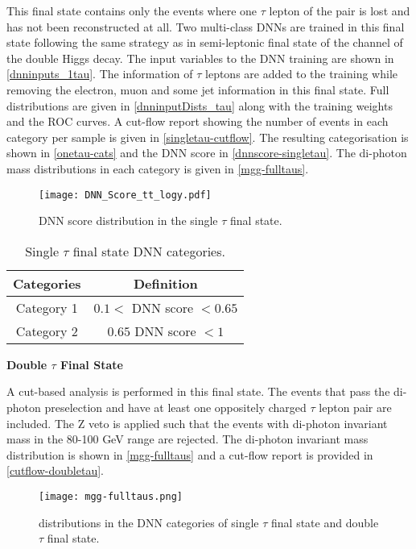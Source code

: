 {This final state contains only the events where one $\tau$ lepton of the pair is lost and has not been reconstructed at all. Two multi-class DNNs are trained in this final state following the same strategy as in semi-leptonic final state of the \wwgg channel of the double Higgs decay. The input variables to the DNN training are shown in \autoref{dnninputs_1tau}. The information of $\tau$ leptons are added to the training while removing the electron, muon and some jet information in this final state. Full distributions are given in \autoref{dnninputDists_tau} along with the training weights and the ROC curves. A cut-flow report showing the number of events in each category per sample is given in \autoref{singletau-cutflow}. The resulting categorisation is shown in \autoref{onetau-cats} and the DNN score in \autoref{dnnscore-singletau}. The di-photon mass distributions in each category is given in \autoref{mgg-fulltaus}.

\begin{figure}[h!]
    \centering
	\texttt{[image: DNN\_Score\_tt\_logy.pdf]}
	\vspace{2mm}
	\caption{DNN score distribution in the single $\tau$ final state.}
	\label{dnnscore-singletau}
\end{figure}

\begin{table}[h!]
    \centering
    \begin{tabular}{cc}
    \hline
    \hline
        Categories  &   Definition \\
        \hline
        Category 1 & $ 0.1< $ DNN score $ <0.65$ \\
        Category 2 & $ 0.65 $ DNN score $ <1 $\\
         \hline
    \end{tabular}
    \caption{Single $\tau$ final state DNN categories.}
    \label{onetau-cats}
\end{table}

\textbf{Double $\tau$ Final State}

A cut-based analysis is performed in this final state. The events that pass the di-photon preselection and have at least one oppositely charged $\tau$ lepton pair are included. The Z veto is applied such that the events with di-photon invariant mass in the 80-100 GeV range are rejected. The di-photon invariant mass distribution is shown in \autoref{mgg-fulltaus} and a cut-flow report is provided in \autoref{cutflow-doubletau}.

\begin{figure}[h!]
    \centering
	\texttt{[image: mgg-fulltaus.png]}
	\vspace{2mm}
	\caption{\mgg distributions in the DNN categories of single $\tau$ final state and double $\tau$ final state.}
	\label{mgg-fulltaus}
\end{figure}

}
